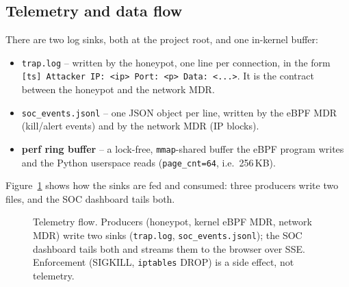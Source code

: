 \documentclass[11pt]{article}
\newcommand{\co}[1]{\texttt{#1}}
\begin{document}
\subsection{Telemetry and data flow}
\label{sec:telemetry}
There are two log sinks, both at the project root, and one in-kernel buffer:

\begin{itemize}[leftmargin=1.4em]
  \item \co{trap.log} -- written by the honeypot, one line per connection,
        in the form \co{[ts] Attacker IP: <ip> Port: <p> Data: <...>}. It is
        the contract between the honeypot and the network MDR.
  \item \co{soc\_events.jsonl} -- one JSON object per line, written by the
        eBPF MDR (kill/alert events) and by the network MDR (IP blocks).
  \item \textbf{perf ring buffer} -- a lock-free, \co{mmap}-shared buffer the
        eBPF program writes and the Python userspace reads (\co{page\_cnt=64},
        i.e.\ 256\,KB).
\end{itemize}

\noindent
Figure~\ref{fig:flow} shows how the sinks are fed and consumed: three
producers write two files, and the SOC dashboard tails both.

\begin{figure}[ht]
\centering
{}
\caption{Telemetry flow. Producers (honeypot, kernel eBPF MDR, network MDR)
write two sinks (\texttt{trap.log}, \texttt{soc\_events.jsonl}); the SOC
dashboard tails both and streams them to the browser over SSE. Enforcement
(SIGKILL, \texttt{iptables} DROP) is a side effect, not telemetry.}
\label{fig:flow}
\end{figure}
\end{document}
